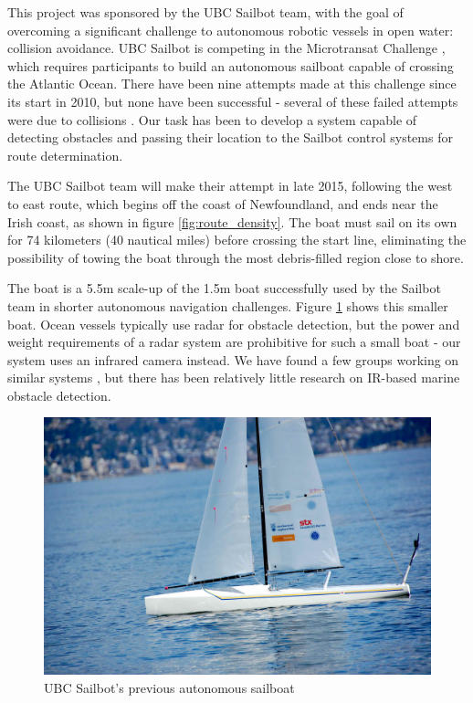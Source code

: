 This project was sponsored by the UBC Sailbot team, with the goal of overcoming a significant challenge to autonomous robotic vessels in open water: collision avoidance. UBC Sailbot is competing in the Microtransat Challenge \cite{transat-history}, which requires participants to build an autonomous sailboat capable of crossing the Atlantic Ocean.  There have been nine attempts made at this challenge since its start in 2010, but none have been successful - several of these failed attempts were due to collisions \cite{transat-history}.  Our task has been to develop a system capable of detecting obstacles and passing their location to the Sailbot control systems for route determination.

The UBC Sailbot team will make their attempt in late 2015, following the west to east route, which begins off the coast of Newfoundland, and ends near the Irish coast, as shown in figure \ref{fig:route_density}. The boat must sail on its own for 74 kilometers (40 nautical miles) before crossing the start line, eliminating the possibility of towing the boat through the most debris-filled region close to shore.

The boat is a 5.5m scale-up of the 1.5m boat successfully used by the Sailbot team in shorter autonomous navigation challenges. Figure \ref{fig:sailbot} shows this smaller boat.  Ocean vessels typically use radar for obstacle detection, but the power and weight requirements of a radar system are prohibitive for such a small boat - our system uses an infrared camera instead. We have found a few groups working on similar systems \cite{ODU-boat-IR-detection}, but there has been relatively little research on IR-based marine obstacle detection.

\begin{figure}
\includegraphics[width=120mm,natwidth=1203,natheight=627]{"./image/sailbot"}
\caption[UBC Sailbot.]{\label{fig:sailbot}UBC Sailbot's previous autonomous sailboat \cite{ubc-sailbot__image}}
\end{figure}

